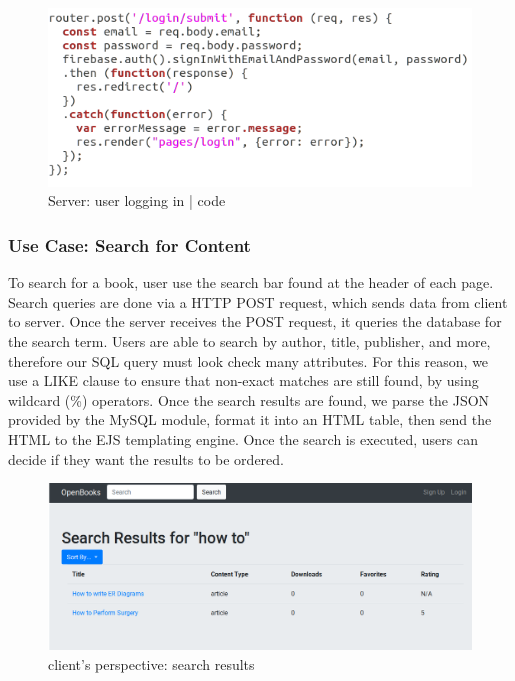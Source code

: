 \documentclass[letter, 12pt, titlepage]{article}
\begin{document}
	\begin{figure}[h!]
		\centering
		\includegraphics[scale=0.50]{login-code.png}
		\caption{Server: user logging in | code}
	\end{figure}

\newpage

	\subsubsection{Use Case: Search for Content}
To search for a book, user use the search bar found at the header of each page. Search queries are done via a HTTP POST request, which sends data from client to server. Once the server receives the POST request, it queries the database for the search term. Users are able to search by author, title, publisher, and more, therefore our SQL query must look check many attributes. For this reason, we use a LIKE clause to ensure that non-exact matches are still found, by using wildcard (\%) operators. Once the search results are found, we parse the JSON provided by the MySQL module, format it into an HTML table, then send the HTML to the EJS templating engine. Once the search is executed, users can decide if they want the results to be ordered.



	\begin{figure}[h!]
		\includegraphics[scale=0.4]{search-results.png}
		\caption{client's perspective: search results}
	\end{figure}
\end{document}
